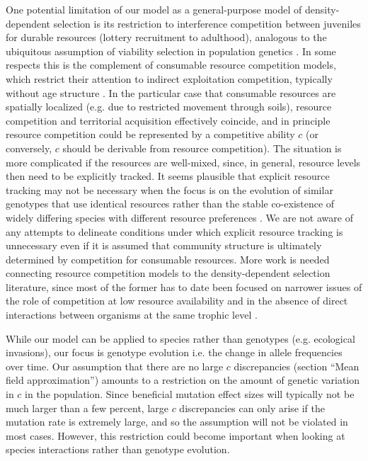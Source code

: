 \documentclass[11pt]{article}
\begin{document}
One potential limitation of our model as a general-purpose model of density-dependent selection is its restriction to interference competition between juveniles for durable resources (lottery recruitment to adulthood), analogous to the ubiquitous assumption of viability selection in population genetics \citep[p. 45]{ewens_2004}. In some respects this is the complement of consumable resource competition models, which restrict their attention to indirect exploitation competition, typically without age structure \citep{tilman_1982}. In the particular case that consumable resources are spatially localized (e.g. due to restricted movement through soils), resource competition and territorial acquisition effectively coincide, and in principle resource competition could be represented by a competitive ability $c$ (or conversely, $c$ should be derivable from resource competition). The situation is more complicated if the resources are well-mixed, since, in general, resource levels then need to be explicitly tracked. It seems plausible that explicit resource tracking may not be necessary when the focus is on the evolution of similar genotypes that use identical resources rather than the stable co-existence of widely differing species with different resource preferences \citep{ram_2016}. We are not aware of any attempts to delineate conditions under which explicit resource tracking is unnecessary even if it is assumed that community structure is ultimately determined by competition for consumable resources. More work is needed connecting resource competition models to the density-dependent selection literature, since most of the former has to date been focused on narrower issues of the role of competition at low resource availability and in the absence of direct interactions between organisms at the same trophic level \citep{aerts_1999,davis_1998,tilman_2007}.  

While our model can be applied to species rather than genotypes (e.g. ecological invasions), our focus is genotype evolution i.e. the change in allele frequencies over time. Our assumption that there are no large $c$ discrepancies (section ``Mean field approximation'') amounts to a restriction on the amount of genetic variation in $c$ in the population. Since beneficial mutation effect sizes will typically not be much larger than a few percent, large $c$ discrepancies can only arise if the mutation rate is extremely large, and so the assumption will not be violated in most cases. However, this restriction could become important when looking at species interactions rather than genotype evolution.
\end{document}
